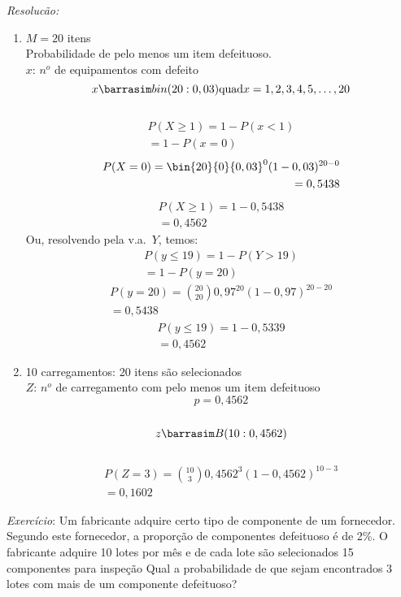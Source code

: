 \documentclass[11pt,a4paper]{article}
\begin{document}
\emph{Resolucão:}
\begin{enumerate}[label=(\alph*)]
  \item    $M=20$ itens\\
    Probabilidade de pelo menos um item defeituoso.\\
    $x$: $n^o$ de equipamentos com defeito\\
    $$x \barrasim bin(20:0,03) \text{quad} x=1,2,3,4,5,\dots,20$$\\
    \begin{align*}
      P(X\ge 1)= 1-P(x<1)\\
      =1-P(x=0)
    \end{align*}
    \begin{align*}
      P(X=0)= \bin{20}{0} {0,03}^0 (1-0,03)^{20-0}\\
      =0,5438
    \end{align*}
    \begin{align*}
      P(X\ge 1)= 1-0,5438\\
      =0,4562
    \end{align*}
    Ou, resolvendo pela v.a.\ $Y$, temos:
    \begin{align*}
      P(y\le 19)=1-P(Y>19)\\
      =1-P(y=20)
    \end{align*}
    \begin{align*}
      P(y=20)=\binom{20}{20}0,97^{20}(1-0,97)^{20-20}\\
      =0,5438
    \end{align*}
    \begin{align*}
      P(y\le 19)=1-0,5339\\
      =0,4562
    \end{align*}
  \item 10 carregamentos: 20 itens são selecionados \\
    $Z$: $n^o$ de carregamento com pelo menos um item defeituoso \\
    $$p=0,4562$$\\
    $$z \barrasim B(10:0,4562)$$\\
    \begin{align*}
      P(Z=3)=\binom{10}{3}0,4562^3 (1-0,4562)^{10-3}\\
      =0,1602
    \end{align*}
\end{enumerate}

\emph{Exercício}: Um fabricante adquire certo tipo de componente de um fornecedor.
Segundo este fornecedor, a proporção de componentes defeituoso é de 2\%. O fabricante
adquire 10 lotes por mês e de cada lote são selecionados 15 componentes para 
inspeção Qual a probabilidade de que sejam encontrados 3 lotes com mais de um 
componente defeituoso?
\end{document}
